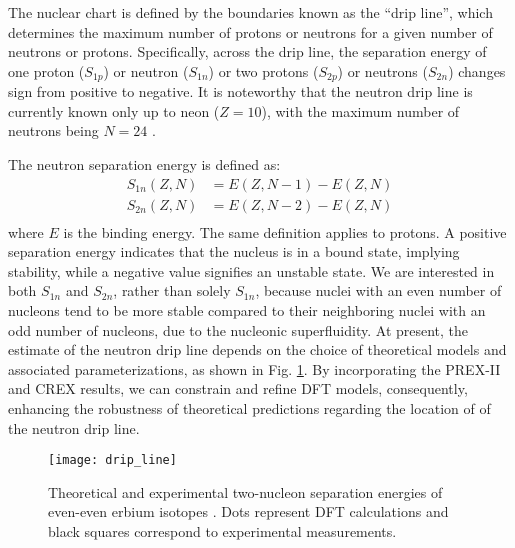 The nuclear chart is defined by the boundaries known as the ``drip line'', 
which determines the maximum number of protons or neutrons for a given number 
of neutrons or protons. Specifically, across the drip line, the
separation energy of one proton ($S_{1p}$) or neutron ($S_{1n}$) 
or two protons ($S_{2p}$) or neutrons ($S_{2n}$) changes sign from positive to negative.
It is noteworthy that the neutron drip line is currently known only up to neon ($Z=10$), with the 
maximum number of neutrons being $N=24$ \cite{PhysRevLett.123.212501}. 


The neutron separation energy is defined as:
\begin{equation}
    \begin{aligned}
	S_{1n}(Z, N) &= E(Z, N-1) - E(Z, N) \\
	S_{2n}(Z, N) &= E(Z, N-2) - E(Z, N) \\
    \end{aligned}
\end{equation}
where $E$ is the binding energy. The same definition applies to protons.
A positive separation energy indicates that the nucleus is in a bound state, 
implying stability, while a negative value signifies an unstable state.
We are interested in both $S_{1n}$ and $S_{2n}$, rather than solely $S_{1n}$, because nuclei
with an even number of nucleons tend to be more stable compared to their neighboring
nuclei with an odd number of nucleons, due to the nucleonic superfluidity. 
At present, the estimate of the neutron drip line depends on the choice of 
theoretical models and associated parameterizations, as shown in Fig. \ref{fig:neutron_drip_line}. 
By incorporating the PREX-II and CREX results, we can constrain and refine
DFT models, consequently, enhancing the robustness of theoretical predictions
regarding the location of of the neutron drip line.
\begin{figure}[!h]
    \centering
    \texttt{[image: drip\_line]}
    \caption[2-neutron separation energy]
    {Theoretical and experimental two-nucleon separation energies of
    even-even erbium isotopes \cite{Erler2012}. Dots represent DFT calculations
    and black squares correspond to experimental measurements.
    }
    \label{fig:neutron_drip_line}
\end{figure}

